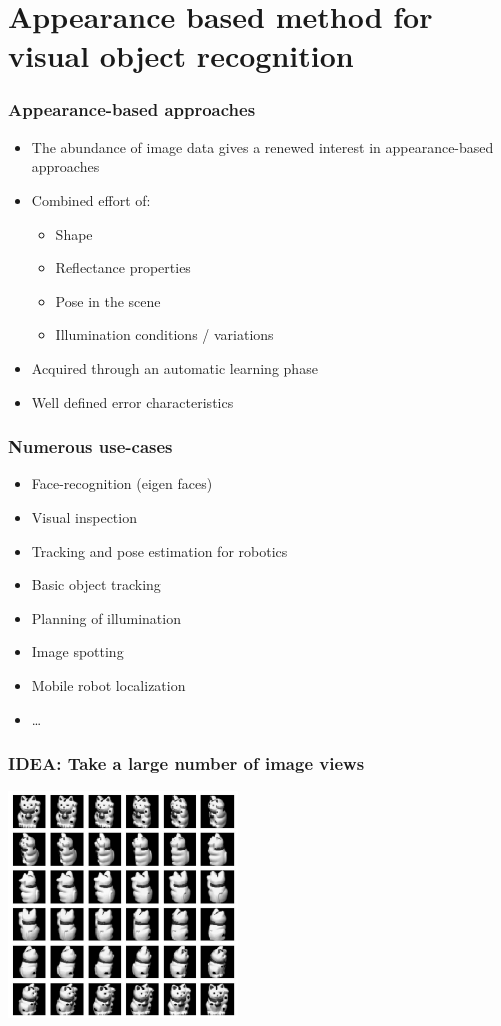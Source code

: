 \documentclass[10pt]{beamer}
\begin{document}
\section{Appearance based method for visual object recognition}
\label{sec:appearance-rec}

\begin{frame}
  \frametitle{Appearance-based approaches}
  \begin{itemize}
  \item The abundance of image data gives a renewed interest in appearance-based approaches
  \item Combined effort of:
    \begin{itemize}
    \item Shape
    \item Reflectance properties
    \item Pose in the scene
    \item Illumination conditions / variations
    \end{itemize}
  \item Acquired through an automatic learning phase
  \item Well defined error characteristics
  \end{itemize}
\end{frame}

\begin{frame}
  \frametitle{Numerous use-cases}
  \begin{itemize}
  \item Face-recognition (eigen faces)
  \item Visual inspection
  \item Tracking and pose estimation for robotics
  \item Basic object tracking
  \item Planning of illumination
  \item Image spotting
  \item Mobile robot localization
  \item \ldots
  \end{itemize}
\end{frame}

\begin{frame}
  \frametitle{IDEA: Take a large number of image views}
  \centerline{\includegraphics[height=6cm]{rotating-kitty}}
\end{frame}
\end{document}
